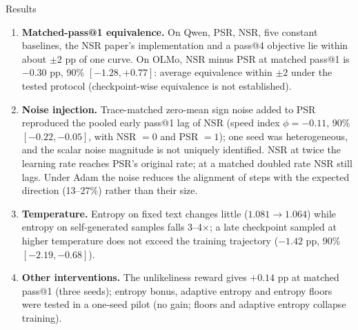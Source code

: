 \documentclass[10pt]{article}
\begin{document}
\begin{res}{Results}
\begin{enumerate}
\item \textbf{Matched-pass@1 equivalence.} On Qwen, PSR, NSR, five constant baselines, the NSR paper's implementation and a pass@4 objective lie within about $\pm2$ pp of one curve. On OLMo, NSR minus PSR at matched pass@1 is $-0.30$ pp, 90\% $[-1.28,+0.77]$: average equivalence within $\pm2$ under the tested protocol (checkpoint-wise equivalence is not established).
\item \textbf{Noise injection.} Trace-matched zero-mean sign noise added to PSR reproduced the pooled early pass@1 lag of NSR (speed index $\phi=-0.11$, 90\% $[-0.22,-0.05]$, with NSR $=0$ and PSR $=1$); one seed was heterogeneous, and the scalar noise magnitude is not uniquely identified. NSR at twice the learning rate reaches PSR's original rate; at a matched doubled rate NSR still lags. Under Adam the noise reduces the alignment of steps with the expected direction (13--27\%) rather than their size.
\item \textbf{Temperature.} Entropy on fixed text changes little ($1.081\to1.064$) while entropy on self-generated samples falls 3--4$\times$; a late checkpoint sampled at higher temperature does not exceed the training trajectory ($-1.42$ pp, 90\% $[-2.19,-0.68]$).
\item \textbf{Other interventions.} The unlikeliness reward gives $+0.14$ pp at matched pass@1 (three seeds); entropy bonus, adaptive entropy and entropy floors were tested in a one-seed pilot (no gain; floors and adaptive entropy collapse training).
\end{enumerate}
\end{res}
\end{document}

